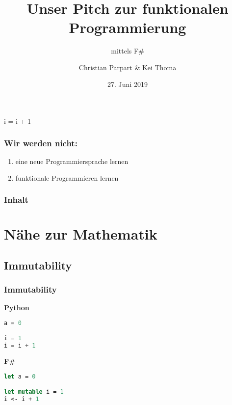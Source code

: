 \documentclass{beamer}
\title[F\#]{Unser Pitch zur funktionalen Programmierung
}
\subtitle{mittels F\#}
\author[Parpart \& Thoma]{Christian Parpart \& Kei Thoma}
\institute[HU]{Humboldt Universität zu Berlin}
\date{27. Juni 2019}
\begin{document}
\frame{\titlepage}

\begin{frame}
    \begin{center}
        {\Huge i = i + 1}
    \end{center}
\end{frame}

\begin{frame}
    \frametitle{Wir werden nicht:}
    \begin{enumerate}
        \item eine neue Programmiersprache lernen
        \item funktionale Programmieren lernen
    \end{enumerate}
\end{frame}

\frame{\titlepage}

\begin{frame}
    \frametitle{Inhalt}
    \tableofcontents
\end{frame}

\section{Nähe zur Mathematik}

\subsection{Immutability}

\begin{frame}[fragile]
    \frametitle{Immutability}
    \begin{minipage}[t]{0.5\linewidth}
        \begin{center}
            \textbf{Python}
        \end{center}
        \begin{lstlisting}[language=Python,numbersep=0pt,resetmargins=true]
a = 0

i = 1
i = i + 1
        \end{lstlisting}
        \end{minipage}%
        \begin{minipage}[t]{0.5\linewidth}
        \begin{center}
            \textbf{F\#}
        \end{center}
        \begin{lstlisting}[language=FSharp]
let a = 0

let mutable i = 1
i <- i + 1
        \end{lstlisting}
        \end{minipage}%
\end{frame}
\end{document}
